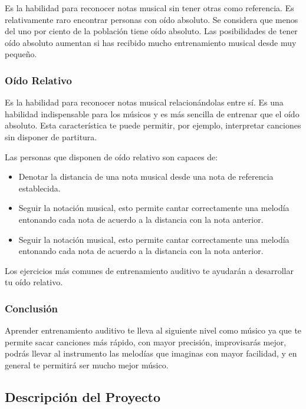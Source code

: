 \documentclass[12pt,twoside,titlepage]{report}
\begin{document}
Es la habilidad para reconocer notas musical sin tener otras como referencia. Es relativamente raro encontrar personas con oído absoluto. Se considera que menos del uno por ciento de la población tiene oído absoluto. Las posibilidades de tener oído absoluto aumentan si has recibido mucho entrenamiento musical desde muy pequeño.

\subsubsection{Oído Relativo}

Es la habilidad para reconocer notas musical relacionándolas entre sí. Es una habilidad indispensable para los músicos y es más sencilla de entrenar que el oído absoluto. Esta característica te puede permitir, por ejemplo, interpretar canciones sin disponer de partitura.

Las personas que disponen de oído relativo son capaces de:
\begin{itemize}
    \item Denotar la distancia de una nota musical desde una nota de referencia establecida.
    
    \item Seguir la notación musical, esto permite cantar correctamente una melodía entonando cada nota de acuerdo a la distancia con la nota anterior.
    
    \item Seguir la notación musical, esto permite cantar correctamente una melodía entonando cada nota de acuerdo a la distancia con la nota anterior.
\end{itemize}

Los ejercicios más comunes de entrenamiento auditivo te ayudarán a desarrollar tu oído relativo.

\subsubsection{Conclusión}

Aprender entrenamiento auditivo te lleva al siguiente nivel como músico ya que te permite sacar canciones más rápido, con mayor precisión, improvisarás mejor, podrás llevar al instrumento las melodías que imaginas con mayor facilidad, y en general te permitirá ser mucho mejor músico.

\subsection{Descripción del Proyecto}
\end{document}
